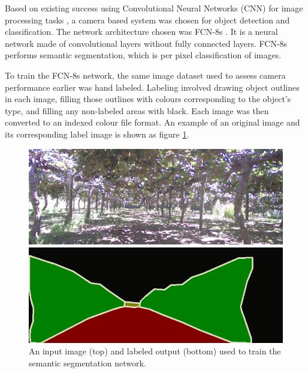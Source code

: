 \documentclass[preprint,authoryear,12pt]{elsarticle}
\begin{document}
        Based on existing success using Convolutional Neural Networks (CNN) for image processing tasks \citep{LeCun2015}, a camera based system was chosen for object detection and classification.
    	The network architecture chosen was FCN-8s \citep{long2015}.
        It is a neural network made of convolutional layers without fully connected layers.
    	FCN-8s performs semantic segmentation, which is per pixel classification of images.

        To train the FCN-8s network, the same image dataset used to assess camera performance earlier was hand labeled.
    	Labeling involved drawing object outlines in each image, filling those outlines with colours corresponding to the object's type, and filling any non-labeled areas with black.
        Each image was then converted to an indexed colour file format.
    	An example of an original image and its corresponding label image is shown as figure \ref{fig:segImgLabelPair}.

        \begin{figure}[htb]
            \centering
            \includegraphics[width=\linewidth]{imgs/photos/segImgLabelPair_trimmed.png}
            \caption{
                An input image (top) and labeled output (bottom) used to train the semantic segmentation network.
            }
            \label{fig:segImgLabelPair}
        \end{figure}
\end{document}

